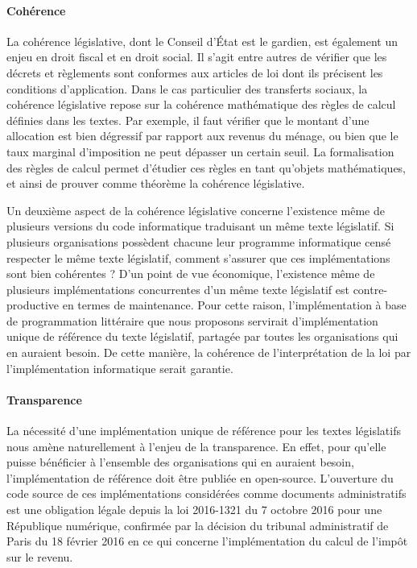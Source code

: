 \paragraph{Cohérence} La cohérence législative, dont le Conseil d'État est le gardien, est également un enjeu en droit fiscal et en droit social. Il s'agit entre autres de vérifier que les décrets et règlements sont conformes aux articles de loi dont ils précisent les conditions d'application. Dans le cas particulier des transferts sociaux, la cohérence législative repose sur la cohérence mathématique des règles de calcul définies dans les textes. Par exemple, il faut vérifier que le montant d'une allocation est bien dégressif par rapport aux revenus du ménage, ou bien que le taux marginal d'imposition ne peut dépasser un certain seuil. La formalisation des règles de calcul permet d'étudier ces règles en tant qu'objets mathématiques, et ainsi de prouver comme théorème la cohérence législative.

Un deuxième aspect de la cohérence législative concerne l'existence même de plusieurs versions du code informatique traduisant un même texte législatif. Si plusieurs organisations possèdent chacune leur programme informatique censé respecter le même texte législatif, comment s'assurer que ces implémentations sont bien cohérentes ? D'un point de vue économique, l'existence même de plusieurs implémentations concurrentes d'un même texte législatif est contre-productive en termes de maintenance. Pour cette raison, l’implémentation à base de programmation littéraire que nous proposons servirait d’implémentation unique de référence du texte législatif, partagée par toutes les organisations qui en auraient besoin. De cette manière, la cohérence de l’interprétation de la loi par l’implémentation informatique serait garantie.

\paragraph{Transparence} La nécessité d'une implémentation unique de référence pour les textes législatifs nous amène naturellement à l'enjeu de la transparence. En effet, pour qu'elle puisse bénéficier à l'ensemble des organisations qui en auraient besoin, l'implémentation de référence doit être publiée en open-source. L'ouverture du code source de ces implémentations considérées comme documents administratifs est une obligation légale depuis la loi 2016-1321 du 7 octobre 2016 pour une République numérique, confirmée par la décision du tribunal administratif de Paris du 18 février 2016 en ce qui concerne l'implémentation du calcul de l'impôt sur le revenu.

